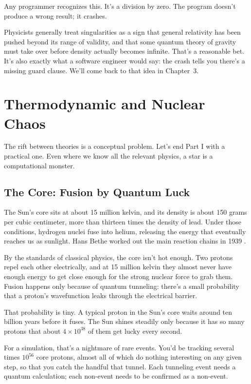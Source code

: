 Any programmer recognizes this. It's a division by zero. The program doesn't produce a wrong result; it crashes.

Physicists generally treat singularities as a sign that general relativity has been pushed beyond its range of validity, and that some quantum theory of gravity must take over before density actually becomes infinite. That's a reasonable bet. It's also exactly what a software engineer would say: the crash tells you there's a missing guard clause. We'll come back to that idea in Chapter~3.

\section{Thermodynamic and Nuclear Chaos}

The rift between theories is a conceptual problem. Let's end Part I with a practical one. Even where we know all the relevant physics, a star is a computational monster.

\subsection{The Core: Fusion by Quantum Luck}

The Sun's core sits at about 15 million kelvin, and its density is about 150 grams per cubic centimeter, more than thirteen times the density of lead. Under those conditions, hydrogen nuclei fuse into helium, releasing the energy that eventually reaches us as sunlight. Hans Bethe worked out the main reaction chains in 1939 \cite{bethe1939}.

By the standards of classical physics, the core isn't hot enough. Two protons repel each other electrically, and at 15 million kelvin they almost never have enough energy to get close enough for the strong nuclear force to grab them. Fusion happens only because of quantum tunneling: there's a small probability that a proton's wavefunction leaks through the electrical barrier.

That probability is tiny. A typical proton in the Sun's core waits around ten billion years before it fuses. The Sun shines steadily only because it has so many protons that about \(4 \times 10^{38}\) of them get lucky every second.

For a simulation, that's a nightmare of rare events. You'd be tracking several times \(10^{56}\) core protons, almost all of which do nothing interesting on any given step, so that you catch the handful that tunnel. Each tunneling event needs a quantum calculation; each non-event needs to be confirmed as a non-event.

